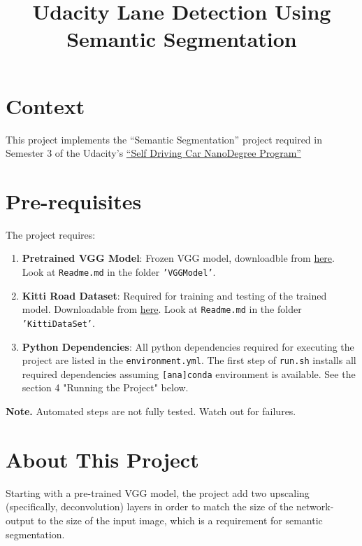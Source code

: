 \documentclass{article}
\title{Udacity Lane Detection Using Semantic Segmentation}
\date{\vspace{-5ex}}
\begin{document}
\maketitle


\section{Context}
This project implements the “Semantic Segmentation” project required in Semester 3 of the Udacity’s \href{https://de.udacity.com/course/self-driving-car-engineer-nanodegree--nd013}{“Self Driving Car NanoDegree Program”} 

\section{Pre-requisites}
The project requires:
\begin{enumerate}
\item \textbf{Pretrained VGG Model}: Frozen VGG model, downloadble from \href{https://s3-us-west-1.amazonaws.com/udacity-selfdrivingcar/vgg.zip}{here}. Look at \texttt{Readme.md} in the folder \texttt{'VGGModel'}.

\item \textbf{Kitti Road Dataset}: Required for training and testing of the trained model. Downloadable from 
\href{https://s3-us-west-1.amazonaws.com/udacity-selfdrivingcar/advanced\_deep\_learning/data\_road.zip}{here}. Look at \texttt{Readme.md} in the folder \texttt{'KittiDataSet'}.

\item \textbf{Python Dependencies}: All python dependencies required for executing the project are listed in the \texttt{environment.yml}. The first step of \texttt{run.sh} installs all required dependencies assuming \texttt{[ana]conda} environment is available. See the section 4 "Running the Project" below.
\end{enumerate}

\textbf{Note. }Automated steps are not fully tested. Watch out for failures.

\section{About This Project}
Starting with a pre-trained VGG model, the project add two upscaling (specifically, deconvolution) layers in order to match the size of the network-output to the size of the input image, which is a requirement for semantic segmentation. 
\end{document}
